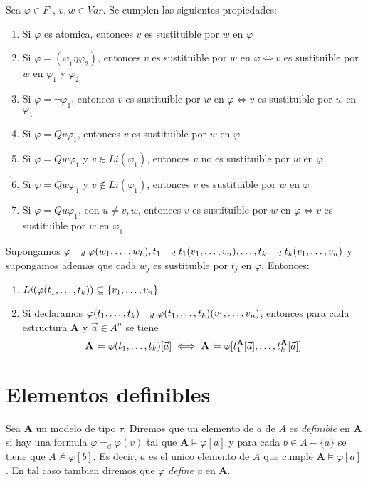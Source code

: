 \begin{lemma}
  Sea $\varphi \in F^\tau$, $v, w \in Var$. Se cumplen las siguientes propiedades: \begin{enumerate}
    \item Si $\varphi$ es atomica, entonces $v$ es sustituible por $w$ en $\varphi$
    \item Si $\varphi = (\varphi_1\eta\varphi_2)$, entonces $v$ es sustituible por $w$ en $\varphi \iff v$ es sustituible por $w$ en $\varphi_1$ y $\varphi_2$
    \item Si $\varphi = \neg\varphi_1$, entonces $v$ es sustituible por $w$ en $\varphi \iff v$ es sustituible por $w$ en $\varphi_1$
    \item Si $\varphi = Qv\varphi_1$, entonces $v$ es sustituible por $w$ en $\varphi$
    \item Si $\varphi = Qw\varphi_1$ y $v \in Li(\varphi_1)$, entonces $v$ no es sustituible por $w$ en $\varphi$
    \item Si $\varphi = Qw\varphi_1$ y $v \not\in Li(\varphi_1)$, entonces $v$ es sustituible por $w$ en $\varphi$
    \item Si $\varphi = Qu\varphi_1$, con $u \neq v, w$, entonces $v$ es sustituible por $w$ en $\varphi \iff v$ es sustituible por $w$ en $\varphi_1$
  \end{enumerate}
\end{lemma}


\begin{theorem}
  Supongamos $\varphi =_d \varphi(w_{1}, \dots, w_{k}), t_1 =_d t_1(v_{1}, \dots, v_{n}), \dots, t_k =_d t_k(v_{1}, \dots, v_{n})$
  y supongamos ademas que cada $w_j$ es sustituible por $t_j$ en $\varphi$. Entonces: \begin{enumerate}
    \item $Li(\varphi(t_{1}, \dots, t_{k})) \subseteq \{v_{1}, \dots, v_{n}\}$
    \item Si declaramos $\varphi(t_{1}, \dots, t_{k}) =_d \varphi(t_{1}, \dots, t_{k})(v_{1}, \dots, v_{n})$, entonces para cada estructura $\mathbf{A}$ y $\vec{a} \in A^n$ se tiene
    $$
    \mathbf{A}\models\varphi(t_{1}, \dots, t_{k})[\vec{a}] \iff \mathbf{A}\models\varphi[t_1^\mathbf{A}[\vec{a}], \dots, t_k^\mathbf{A}[\vec{a}]]
    $$
  \end{enumerate}
\end{theorem}

\noproof

\section*{Elementos definibles}
\begin{definition}
Sea $\mathbf{A}$ un modelo de tipo $\tau$. Diremos que un elemento de $a$ de $A$ es \emph{definible} en $\mathbf{A}$
si hay una formula $\varphi =_d \varphi(v)$ tal que $\mathbf{A}\models\varphi[a]$ y para cada $b \in A -\{a\}$ se tiene que
$A\not\models\varphi[b]$. Es decir, $a$ es el unico elemento de $A$ que cumple $\mathbf{A}\models\varphi[a]$. En tal caso
tambien diremos que $\varphi$ \emph{define a} en $\mathbf{A}$.
\end{definition}

